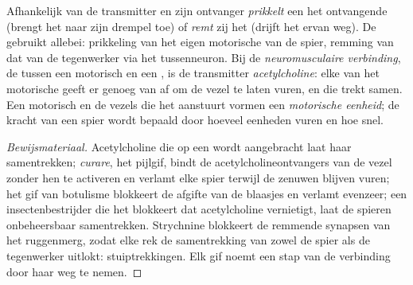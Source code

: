 \begin{proposition}\label{prop:g12:stretch-reflex:junction}
Afhankelijk van de transmitter en zijn ontvanger \emph{prikkelt} een
 het ontvangende  (brengt het naar zijn drempel toe) of
\emph{remt} zij het (drijft het ervan weg). De  gebruikt allebei:
prikkeling van het eigen motorische  van de spier, remming van dat
van de tegenwerker via het tussenneuron. Bij de \emph{neuromusculaire
verbinding}, de  tussen een motorisch  en een , is
de transmitter \emph{acetylcholine}: elke  van het
motorische  geeft er genoeg van af om de vezel te laten vuren, en
die trekt samen. Een motorisch  en de vezels die het aanstuurt
vormen een \emph{motorische eenheid}; de kracht van een spier wordt
bepaald door hoeveel eenheden vuren en hoe snel.
\end{proposition}
\begin{proof}[Bewijsmateriaal]
Acetylcholine die op een  wordt aangebracht laat haar
samentrekken; \emph{curare}, het pijlgif, bindt de acetylcholineontvangers
van de vezel zonder hen te activeren en verlamt elke spier terwijl de
zenuwen blijven vuren; het gif van botulisme blokkeert de afgifte van de
blaasjes en verlamt evenzeer; een insectenbestrijder die het 
blokkeert dat acetylcholine vernietigt, laat de spieren onbeheersbaar
samentrekken. Strychnine blokkeert de remmende synapsen van het
ruggenmerg, zodat elke rek de samentrekking van zowel de spier als de
tegenwerker uitlokt: stuiptrekkingen. Elk gif noemt een stap van de
verbinding door haar weg te nemen.
\end{proof}

